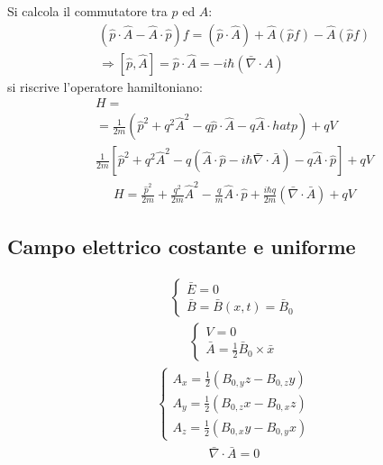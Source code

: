 Si calcola il commutatore tra $p$ ed $A$:
\begin{equation}\begin{split}
\left(\hat p\cdot \hat A-\hat A\cdot \hat p\right)f=\left(\hat p\cdot \hat A\right)+\hat A\left(\hat pf\right)-\hat A\left(\hat pf\right)\\
\Longrightarrow \left[\hat p, \hat A\right]=\hat p\cdot \hat A=-i\hbar \left(\bar \nabla \cdot A\right)
\end{split}\end{equation}
si riscrive l'operatore hamiltoniano:
\begin{equation}\begin{split}
H=\\
=\frac{1}{2m}\left(\hat p^2+q^2\hat A^2-q\hat p\cdot \hat A-q\hat A\cdot hat p\right)+qV \\
\frac{1}{2m}\left[\hat p^2+q^2\hat A^2-q\left(\hat A\cdot \hat p-i\hbar \bar \nabla \cdot \bar A\right)-q\hat A\cdot \hat p\right]+qV
\end{split}\end{equation}
\begin{equation}\begin{split}
H=\frac{\hat p^2}{2m}+\frac{q^2}{2m}\hat A^2-\frac{q}{m}\hat A\cdot \hat p+\frac{i\hbar q}{2m}\left(\bar \nabla \cdot \bar A\right)+qV
\end{split}\end{equation}

\subsection{Campo elettrico costante e uniforme} %
\begin{equation}\begin{split}
\begin{cases}
\bar E=0 \\
\bar B=\bar B\left(x,t\right)=\bar B_0
\end{cases}
\end{split}\end{equation}
\begin{equation}\begin{split}
\begin{cases}
V=0 \\
\bar A=\frac{1}{2}\bar B_0\times \bar x
\end{cases}
\end{split}\end{equation}
\begin{equation}\begin{split}
\begin{cases}
A_x=\frac{1}{2}\left(B_{0,y}z-B_{0,z}y\right) \\
A_y=\frac{1}{2}\left(B_{0,z}x-B_{0,x}z\right) \\
A_z=\frac{1}{2}\left(B_{0,x}y-B_{0,y}x\right)
\end{cases}
\end{split}\end{equation}
\begin{equation}\begin{split}
\bar \nabla \cdot \bar A=0
\end{split}\end{equation}

